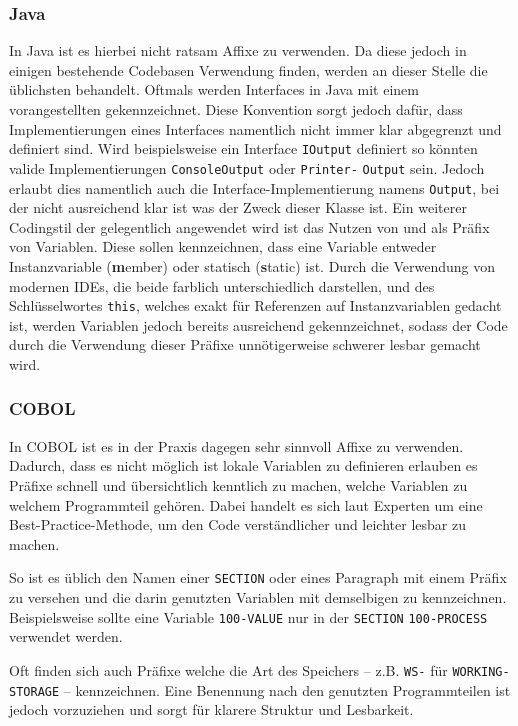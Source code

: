 \subsubsection*{Java}
In Java ist es hierbei nicht ratsam Affixe zu verwenden. Da diese jedoch in einigen bestehende Codebasen Verwendung finden, werden an dieser Stelle die üblichsten behandelt.
Oftmals werden Interfaces in Java mit einem vorangestellten  gekennzeichnet. Diese Konvention sorgt jedoch dafür, dass Implementierungen eines Interfaces namentlich nicht immer klar abgegrenzt und definiert sind. Wird beispielsweise ein Interface \texttt{IOutput} definiert so könnten valide Implementierungen \texttt{ConsoleOutput} oder \texttt{Printer-} \texttt{Output} sein. Jedoch erlaubt dies namentlich auch die Interface-Implementierung namens \texttt{Output}, bei der nicht ausreichend klar ist was der Zweck dieser Klasse ist.
Ein weiterer Codingstil der gelegentlich angewendet wird ist das Nutzen von  und  als Präfix von Variablen. Diese sollen kennzeichnen, dass eine Variable entweder Instanzvariable (\textbf{m}ember) oder statisch (\textbf{s}tatic) ist. Durch die Verwendung von modernen IDEs, die beide farblich unterschiedlich darstellen, und des Schlüsselwortes \texttt{this}, welches exakt für Referenzen auf Instanzvariablen gedacht ist, werden Variablen jedoch bereits ausreichend gekennzeichnet, sodass der Code durch die Verwendung dieser Präfixe unnötigerweise schwerer lesbar gemacht wird.
\subsubsection*{COBOL}\label{affixCOBOL}
In COBOL ist es in der Praxis dagegen sehr sinnvoll Affixe zu verwenden. Dadurch, dass es nicht möglich ist lokale Variablen zu definieren erlauben es Präfixe schnell und übersichtlich kenntlich zu machen, welche Variablen zu welchem Programmteil gehören. Dabei handelt es sich laut Experten um eine Best-Practice-Methode, um den Code verständlicher und leichter lesbar zu machen.

So ist es üblich den Namen einer \texttt{SECTION} oder eines Paragraph mit einem Präfix zu versehen und die darin genutzten Variablen mit demselbigen zu kennzeichnen. Beispielsweise sollte eine Variable \texttt{100-VALUE} nur in der \texttt{SECTION} \texttt{100-PROCESS} verwendet werden. 

Oft finden sich auch Präfixe welche die Art des Speichers -- z.B. \texttt{WS-} für \texttt{WORKING-STORAGE} -- kennzeichnen. Eine Benennung nach den genutzten Programmteilen ist jedoch vorzuziehen und sorgt für klarere Struktur und Lesbarkeit.
